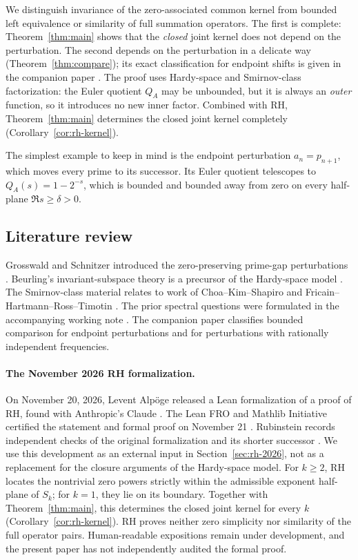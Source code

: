 \documentclass[12pt,letterpaper]{article}
\theoremstyle{remark}
\numberwithin{equation}{section}
\begin{document}
We distinguish invariance of the zero-associated common kernel
from bounded left equivalence or similarity of full summation operators.
The first is complete: Theorem~\ref{thm:main} shows that the
\emph{closed} joint kernel does not depend on the perturbation.
The second depends on the perturbation in a delicate way
(Theorem~\ref{thm:compare}); its exact classification for
endpoint shifts is given in the companion paper \cite{PP26}.
The proof uses Hardy-space and Smirnov-class factorization: the
Euler quotient $Q_A$ may be unbounded, but it is always an
\emph{outer} function, so it introduces no new inner factor.
Combined with RH, Theorem~\ref{thm:main} determines the closed joint
kernel completely (Corollary~\ref{cor:rh-kernel}).

The simplest example to keep in mind is the endpoint perturbation
$a_n=p_{n+1}$, which moves every prime to its successor.  Its Euler
quotient telescopes to $Q_A(s)=1-2^{-s}$, which is bounded and
bounded away from zero on every half-plane $\Re s\ge\delta>0$.
\subsection{Literature review}
Grosswald and Schnitzer introduced the zero-preserving prime-gap
perturbations \cite{GS}.  Beurling's invariant-subspace
theory is a precursor of the Hardy-space model \cite{Beurling}.
The Smirnov-class material relates to work of Choa--Kim--Shapiro
\cite{SmirnovReference} and Fricain--Hartmann--Ross--Timotin
\cite{Fricain}.  The prior spectral questions were formulated
in the accompanying working note \cite{JoynerNote}.
The companion paper \cite{PP26} classifies bounded comparison
for endpoint perturbations and for perturbations with
rationally independent frequencies.

\paragraph{The November 2026 RH formalization.}
On November 20, 2026, Levent Alp\"oge released a Lean formalization
of a proof of RH, found with Anthropic's Claude \cite{Ru26}.
The Lean FRO and Mathlib Initiative certified
the statement and formal proof on November 21 \cite{LF26}.
Rubinstein records independent checks of the original formalization
and its shorter successor \cite{Ru26}. We use this development as an
external input in Section~\ref{sec:rh-2026}, not as a
replacement for the closure arguments of the Hardy-space model.
For $k\ge2$, RH locates the
nontrivial zero powers strictly within the admissible exponent
half-plane of $S_k$; for $k=1$, they lie on its boundary.
Together with Theorem~\ref{thm:main}, this determines the closed
joint kernel for every $k$ (Corollary~\ref{cor:rh-kernel}).
RH proves neither zero simplicity nor similarity of the full
operator pairs. Human-readable expositions remain under development,
and the present paper has not independently audited the formal proof.
\end{document}
